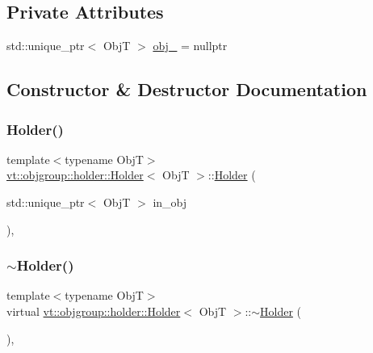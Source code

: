 \subsection*{Private Attributes}
\begin{DoxyCompactItemize}
\item 
std\+::unique\+\_\+ptr$<$ ObjT $>$ \hyperlink{structvt_1_1objgroup_1_1holder_1_1_holder_a098ec3be989e0d95a1ad8d1a31db3eb2}{obj\+\_\+} = nullptr
\end{DoxyCompactItemize}


\subsection{Constructor \& Destructor Documentation}
\mbox{\label{structvt_1_1objgroup_1_1holder_1_1_holder_a7e21e5a25aaef942ad43d07e14e726eb}} 
\subsubsection{\texorpdfstring{Holder()}{Holder()}}
{\footnotesize\ttfamily template$<$typename ObjT$>$ \\
\hyperlink{structvt_1_1objgroup_1_1holder_1_1_holder}{vt\+::objgroup\+::holder\+::\+Holder}$<$ ObjT $>$\+::\hyperlink{structvt_1_1objgroup_1_1holder_1_1_holder}{Holder} (\begin{DoxyParamCaption}\item[{std\+::unique\+\_\+ptr$<$ ObjT $>$}]{in\+\_\+obj }\end{DoxyParamCaption})\hspace{0.3cm}{\ttfamily [inline]}, {\ttfamily [explicit]}}

\mbox{\label{structvt_1_1objgroup_1_1holder_1_1_holder_acc7eb26ff3152043f63164898469fc78}} 
\subsubsection{\texorpdfstring{$\sim$\+Holder()}{~Holder()}}
{\footnotesize\ttfamily template$<$typename ObjT$>$ \\
virtual \hyperlink{structvt_1_1objgroup_1_1holder_1_1_holder}{vt\+::objgroup\+::holder\+::\+Holder}$<$ ObjT $>$\+::$\sim$\hyperlink{structvt_1_1objgroup_1_1holder_1_1_holder}{Holder} (\begin{DoxyParamCaption}{ }\end{DoxyParamCaption})\hspace{0.3cm}{\ttfamily [virtual]}, {\ttfamily [default]}}



